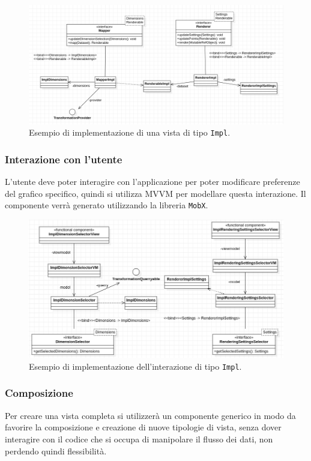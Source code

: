 \begin{figure}[h!]
  \centering
  \includegraphics[scale=0.60]{../../assets/classi_uml/modelvista.png}
  \caption{Esempio di implementazione di una vista di tipo \texttt{Impl}.}
\end{figure}
\newpage
\subsubsection{Interazione con l'utente}
L'utente deve poter interagire con l'applicazione per poter modificare
preferenze del grafico specifico, quindi si utilizza MVVM per modellare questa
interazione. Il componente verrà generato utilizzando la libreria \texttt{MobX}.

\begin{figure}[h!]
  \centering
  \includegraphics[scale=0.55]{../../assets/classi_uml/modelinterazione.png}
  \caption{Esempio di implementazione dell'interazione di tipo \texttt{Impl}.}
\end{figure}

\subsubsection{Composizione}
Per creare una vista completa si utilizzerà un componente generico in modo da
favorire la composizione e creazione di nuove tipologie di vista, senza dover
interagire con il codice che si occupa di manipolare il flusso dei dati, non perdendo quindi flessibilità.

